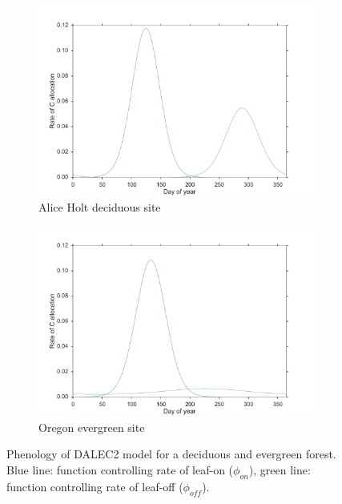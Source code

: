 \documentclass[11pt]{article}
\begin{document}
\begin{figure}[ht]
    \centering
    \begin{subfigure}[b]{0.45\textwidth}
        \includegraphics[width=\textwidth]{ah_pheno.pdf}
        \caption{Alice Holt deciduous site}
        \label{fig:ah_pheno}
    \end{subfigure}%
    \begin{subfigure}[b]{0.45\textwidth}
        \includegraphics[width=\textwidth]{oregon_pheno.pdf}
        \caption{Oregon evergreen site}
        \label{fig:oregon_pheno}
    \end{subfigure}
    \caption{Phenology of DALEC2 model for a deciduous and evergreen forest. Blue line: function controlling rate of leaf-on (\(\phi_{on}\)), green line: function controlling rate of leaf-off (\(\phi_{off}\)).}
    \label{fig:D2_pheno}
\end{figure}
\end{document}
